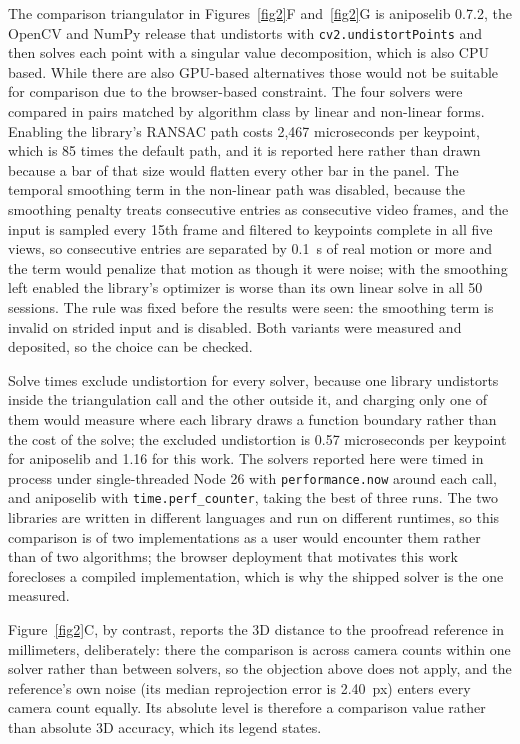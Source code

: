 \documentclass[pdflatex, sn-nature]{sn-jnl}
\theoremstyle{thmstyleone}%
\theoremstyle{thmstyletwo}%
\theoremstyle{thmstylethree}%
\begin{document}
The comparison triangulator in Figures~\ref{fig2}F and~\ref{fig2}G is aniposelib 0.7.2, the OpenCV and NumPy release that undistorts with \texttt{cv2.undistortPoints} and then solves each point with a singular value decomposition, which is also CPU based. While there are also GPU-based alternatives those would not be suitable for comparison due to the browser-based constraint. The four solvers were compared in pairs matched by algorithm class by linear and non-linear forms. Enabling the library's RANSAC path costs 2,467 microseconds per keypoint, which is 85 times the default path, and it is reported here rather than drawn because a bar of that size would flatten every other bar in the panel. The temporal smoothing term in the non-linear path was disabled, because the smoothing penalty treats consecutive entries as consecutive video frames, and the input is sampled every 15th frame and filtered to keypoints complete in all five views, so consecutive entries are separated by 0.1~s of real motion or more and the term would penalize that motion as though it were noise; with the smoothing left enabled the library's optimizer is worse than its own linear solve in all 50 sessions. The rule was fixed before the results were seen: the smoothing term is invalid on strided input and is disabled. Both variants were measured and deposited, so the choice can be checked.

Solve times exclude undistortion for every solver, because one library undistorts inside the triangulation call and the other outside it, and charging only one of them would measure where each library draws a function boundary rather than the cost of the solve; the excluded undistortion is 0.57 microseconds per keypoint for aniposelib and 1.16 for this work. The solvers reported here were timed in process under single-threaded Node 26 with \texttt{performance.now} around each call, and aniposelib with \texttt{time.perf\_counter}, taking the best of three runs. The two libraries are written in different languages and run on different runtimes, so this comparison is of two implementations as a user would encounter them rather than of two algorithms; the browser deployment that motivates this work forecloses a compiled implementation, which is why the shipped solver is the one measured.

Figure~\ref{fig2}C, by contrast, reports the 3D distance to the proofread reference in millimeters, deliberately: there the comparison is across camera counts within one solver rather than between solvers, so the objection above does not apply, and the reference's own noise (its median reprojection error is 2.40~px) enters every camera count equally. Its absolute level is therefore a comparison value rather than absolute 3D accuracy, which its legend states.
\end{document}
